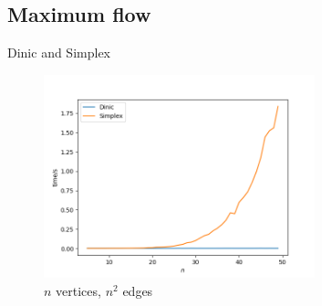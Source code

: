 \subsection{Maximum flow}

\begin{frame}{Dinic and Simplex}

    \begin{figure}
        \includegraphics[width=0.7\textwidth]{assets/maximum_flow_compare.png}
        \caption{$n$ vertices, $n^2$ edges}
    \end{figure}

\end{frame}